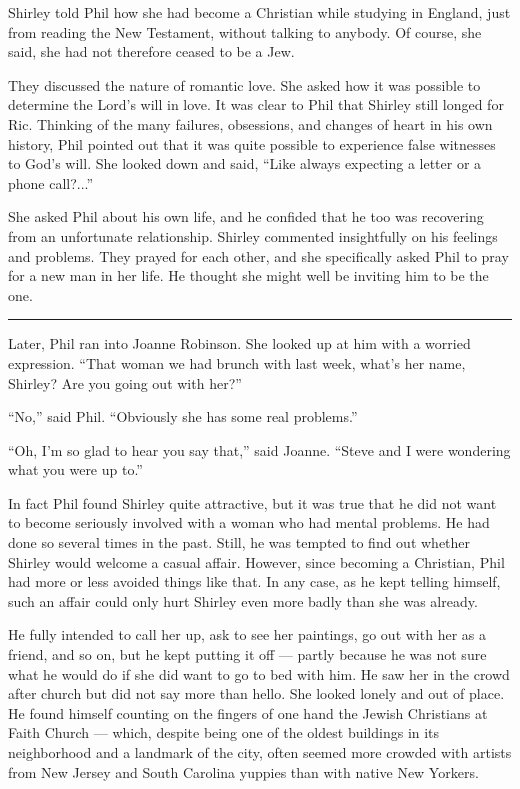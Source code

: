 \documentclass[english,11pt,letterpaper,onecolumn]{scrbook}
\begin{document}
Shirley told Phil how she had become a Christian while studying in England, just from reading the New Testament, without talking to anybody.  Of course, she said, she had not therefore ceased to be a Jew.

They discussed the nature of romantic love.  She asked how it was possible to determine the Lord's will in love.  It was clear to Phil that Shirley still longed for Ric.  Thinking of the many failures, obsessions, and changes of heart in his own history, Phil pointed out that it was quite possible to experience false witnesses to God's will.  She looked down and said, ``Like always expecting a letter or a phone call?...''

	She asked Phil about his own life, and he confided that he too was recovering from an unfortunate relationship.  Shirley commented insightfully on his feelings and problems.  They prayed for each other, and she specifically asked Phil to pray for a new man in her life.  He thought she might well be inviting him to be the one.

\begin{center}\rule[3pt]{2in}{0.5pt}\end{center}

	Later, Phil ran into Joanne Robinson.  She looked up at him with a worried expression.  ``That woman we had brunch with last week, what's her name, Shirley?  Are you going out with her?''

	``No,'' said Phil.  ``Obviously she has some real problems.''

	``Oh, I'm so glad to hear you say that,'' said Joanne.  ``Steve and I were wondering what you were up to.''

	In fact Phil found Shirley quite attractive, but it was true that he did not want to become seriously involved with a woman who had mental problems.  He had done so several times in the past.  Still, he was tempted to find out whether Shirley would welcome a casual affair.  However, since becoming a Christian, Phil had more or less avoided things like that.  In any case, as he kept telling himself, such an affair could only hurt Shirley even more badly than she was already. 

	He fully intended to call her up, ask to see her paintings, go out with her as a friend, and so on, but he kept putting it off --- partly because he was not sure what he would do if she did want to go to bed with him.  He saw her in the crowd after church but did not say more than hello.  She looked lonely and out of place.  He found himself counting on the fingers of one hand the Jewish Christians at Faith Church --- which, despite being one of the oldest buildings in its neighborhood and a landmark of the city, often seemed more crowded with artists from New Jersey and South Carolina yuppies than with native New Yorkers.
\end{document}
